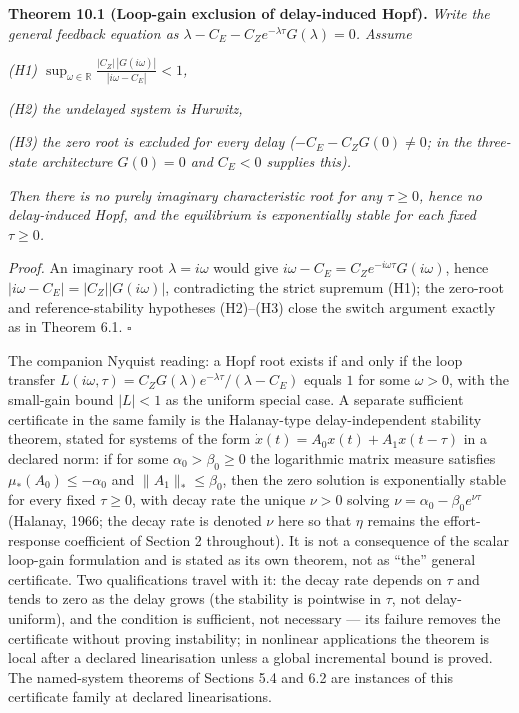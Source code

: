 \documentclass[11pt]{article}
\begin{document}
\textbf{Theorem 10.1 (Loop-gain exclusion of delay-induced Hopf).}
\emph{Write the general feedback equation as
\(\lambda - C_E - C_Z e^{-\lambda\tau}G(\lambda) = 0\). Assume}

\emph{(H1)
\(\sup_{\omega \in \mathbb{R}} \frac{|C_Z|\,|G(i\omega)|}{|i\omega - C_E|} < 1\),}

\emph{(H2) the undelayed system is Hurwitz,}

\emph{(H3) the zero root is excluded for every delay
(\(-C_E - C_Z G(0) \neq 0\); in the three-state architecture
\(G(0) = 0\) and \(C_E < 0\) supplies this).}

\emph{Then there is no purely imaginary characteristic root for any
\(\tau \ge 0\), hence no delay-induced Hopf, and the equilibrium is
exponentially stable for each fixed \(\tau \ge 0\).}

\emph{Proof.} An imaginary root \(\lambda = i\omega\) would give
\(i\omega - C_E = C_Z e^{-i\omega\tau}G(i\omega)\), hence
\(|i\omega - C_E| = |C_Z||G(i\omega)|\), contradicting the strict
supremum (H1); the zero-root and reference-stability hypotheses
(H2)--(H3) close the switch argument exactly as in Theorem 6.1. \ensuremath{\square}

The companion Nyquist reading: a Hopf root exists if and only if the
loop transfer
\(L(i\omega, \tau) = C_Z G(\lambda)e^{-\lambda\tau}/(\lambda - C_E)\)
equals \(1\) for some \(\omega > 0\), with the small-gain bound
\(|L| < 1\) as the uniform special case. A separate sufficient
certificate in the same family is the Halanay-type delay-independent
stability theorem, stated for systems of the form
\(\dot x(t) = A_0 x(t) + A_1 x(t - \tau)\) in a declared norm: if for
some \(\alpha_0 > \beta_0 \ge 0\) the logarithmic matrix measure
satisfies \(\mu_*(A_0) \le -\alpha_0\) and \(\|A_1\|_* \le \beta_0\),
then the zero solution is exponentially stable for every fixed
\(\tau \ge 0\), with decay rate the unique \(\nu > 0\) solving
\(\nu = \alpha_0 - \beta_0 e^{\nu\tau}\) (Halanay, 1966; the decay rate
is denoted \(\nu\) here so that \(\eta\) remains the effort-response
coefficient of Section 2 throughout). It is not a consequence of the
scalar loop-gain formulation and is stated as its own theorem, not as
``the'' general certificate. Two qualifications travel with it: the
decay rate depends on \(\tau\) and tends to zero as the delay grows (the
stability is pointwise in \(\tau\), not delay-uniform), and the
condition is sufficient, not necessary --- its failure removes the
certificate without proving instability; in nonlinear applications the
theorem is local after a declared linearisation unless a global
incremental bound is proved. The named-system theorems of Sections 5.4
and 6.2 are instances of this certificate family at declared
linearisations.
\end{document}
